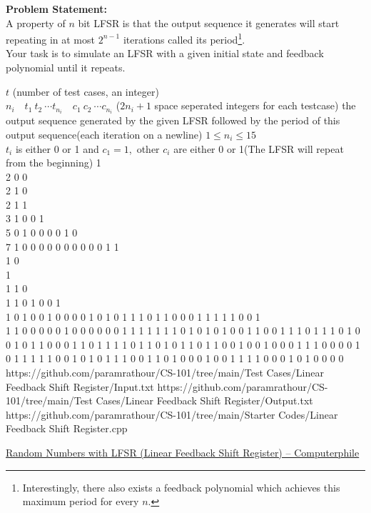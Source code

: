 \vspace{-2em}
\textbf{Problem Statement:}\\
A property of $n$ bit LFSR is that the output sequence it generates will start repeating in at most $2^{n-1}$ iterations called its period\footnote{Interestingly, there also exists a feedback polynomial which achieves this maximum period for every $n$.}.\\
Your task is to simulate an LFSR with a given initial state and feedback polynomial until it repeats.
\begin{testcasesMore}
	{$t$ \hfill(number of test cases, an integer)\\
	$n_i\quad t_1\ t_2\ \cdots t_{n_i}\quad c_1\ c_2\ \cdots c_{n_i}$ \hfill($2n_i+1$ space seperated integers for each testcase)}
	{the output sequence generated by the given LFSR followed by the period of this output sequence\hfill(each iteration on a newline)}
	{$1 \leq n_i \leq 15$\\
	$t_i$ is either 0 or 1 and $c_1 = 1$\footnotemark,\ other $c_i$ are either 0 or 1\hfill(The LFSR will repeat from the beginning)}
	{1 \\2 0 0\\2  1  0\\2  1  1\\3  1 0  0 1\\5  0 1 0 0  0 0 1 0\\7  1 0 0 0 0 0  0 0 0 0 0 1}
	{1\\1 0\\1\\1 1 0\\1 1 0 1 0 0 1\\1 0 1 0 0 1 0 0 0 0 1 0 1 0 1 1 1 0 1 1 0 0 0 1 1 1 1 1 0 0 1\\1 1 0 0 0 0 0 1 0 0 0 0 0 0 1 1 1 1 1 1 1 0 1 0 1 0 1 0 0 1 1 0 0 1 1 1 0 1 1 1 0 1 0 0 1 0 1 1 0 0 0 1 1 0 1 1 1 1 0 1 1 0 1 0 1 1 0 1 1 0 0 1 0 0 1 0 0 0 1 1 1 0 0 0 0 1 0 1 1 1 1 1 0 0 1 0 1 0 1 1 1 0 0 1 1 0 1 0 0 0 1 0 0 1 1 1 1 0 0 0 1 0 1 0 0 0 0}
	{https://github.com/paramrathour/CS-101/tree/main/Test Cases/Linear Feedback Shift Register/Input.txt}
	{https://github.com/paramrathour/CS-101/tree/main/Test Cases/Linear Feedback Shift Register/Output.txt}
	{https://github.com/paramrathour/CS-101/tree/main/Starter Codes/Linear Feedback Shift Register.cpp}
\end{testcasesMore}
\begin{funvideo}
	\href{https://youtu.be/Ks1pw1X22y4}{Random Numbers with LFSR (Linear Feedback Shift Register) -- Computerphile}
\end{funvideo}
\recalctypearea